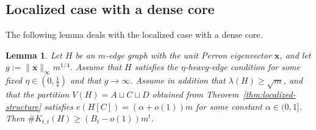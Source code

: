 \documentclass[10pt,a4paper]{amsart}
\newtheorem{lemma}[theorem]{Lemma}
\newcommand{\Ktt}{K_{t,t}}
\begin{document}
\subsection{Localized case with a dense core}

The following lemma deals with the localized case with a dense core.

\begin{lemma} 
\label{lem:lemmaC-localized-nonsparse}
Let $H$ be an $m$-edge graph with the unit Perron eigenvector \(\bm{x}\), and let  
$g:=\|\bm{x} \|_\infty m^{1/4}$.  
Assume that \(H\) satisfies the \(\eta\)-heavy-edge condition for some fixed \(\eta\in(0,\tfrac14)\) and that \(g\to\infty\). Assume in addition that \(\lambda(H)\ge\sqrt m\), and that the partition \(V(H)=A\sqcup C\sqcup D\) obtained from Theorem~\ref{thm:localized-structure} satisfies
$e(H[C])=(\alpha+o(1))m$ for some constant \(\alpha\in(0,1]\). Then
$\texttt{\#}\Ktt(H)\ge (B_t-o(1))m^t$.
\end{lemma}
\end{document}
